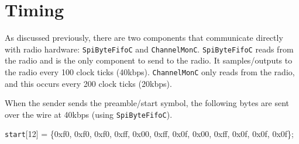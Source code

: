 \documentclass[11pt]{article}
\begin{document}
\section*{Timing}
As discussed previously, there are two components that communicate
directly with radio hardware: {\tt SpiByteFifoC} and
{\tt ChannelMonC}. {\tt SpiByteFifoC} reads from the radio and is the only component to send to the
radio. It samples/outputs to the radio every 100 clock ticks (40kbps).  {\tt ChannelMonC} only reads from the radio, and this
occurs every 200 clock ticks (20kbps).

When the sender sends the preamble/start symbol, the following bytes
are sent over the wire at 40kbps (using {\tt SpiByteFifoC}).

{\tt start}[12] = \{0xf0, 0xf0, 0xf0, 0xff, 0x00, 0xff, 0x0f, 0x00, 0xff, 0x0f, 0x0f, 0x0f\};
\end{document}

